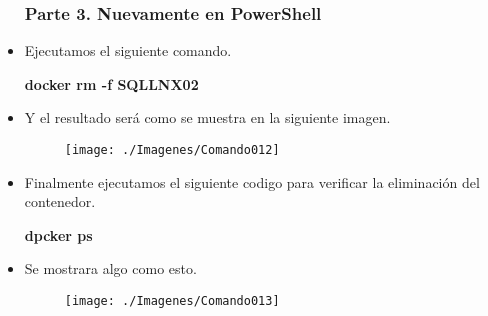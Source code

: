 \begin{itemize}
				\subsubsection{Parte 3. Nuevamente en PowerShell}
					\item Ejecutamos el siguiente comando.
						\begin{center}
							\textbf{docker rm -f SQLLNX02} \\
						\end{center}
					\item Y el resultado será como se muestra en la siguiente imagen.
						\begin{figure}[htb]						
							\begin{center}
								\texttt{[image: ./Imagenes/Comando012]}
							\end{center}
						\end{figure}
					\item Finalmente ejecutamos el siguiente codigo para verificar la eliminación del contenedor.
						\begin{center}
							\textbf{dpcker ps} \\
						\end{center}
					\item Se mostrara algo como esto.
						\begin{figure}[htb]
							\begin{center}
								\texttt{[image: ./Imagenes/Comando013]}
							\end{center}
						\end{figure}

\end{itemize}
